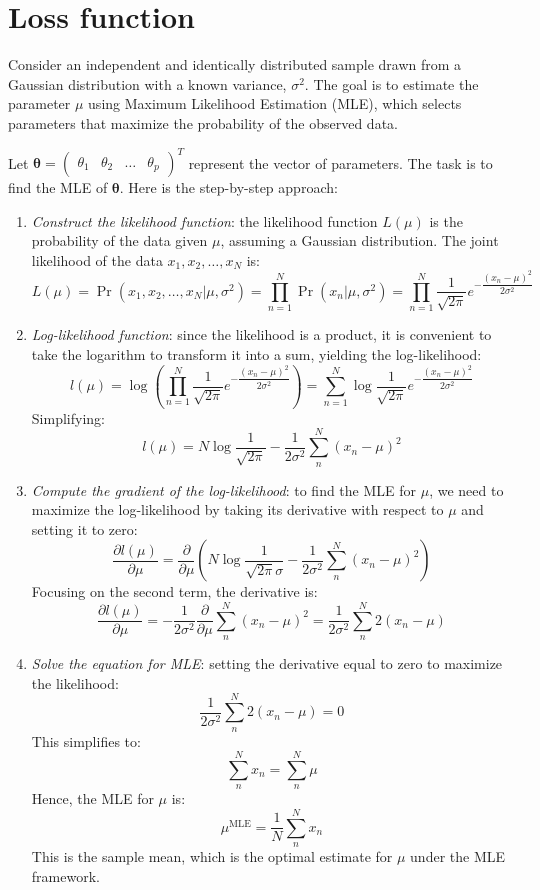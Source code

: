 \section{Loss function}

Consider an independent and identically distributed sample drawn from a Gaussian distribution with a known variance, $\sigma^2$.
The goal is to estimate the parameter $\mu$ using Maximum Likelihood Estimation (MLE), which selects parameters that maximize the probability of the observed data.

Let $\boldsymbol{\theta}=\begin{pmatrix} \theta_1 & \theta_2 & \dots & \theta_p \end{pmatrix}^T$ represent the vector of parameters. 
The task is to find the MLE of $\boldsymbol{\theta}$.
Here is the step-by-step approach:
\begin{enumerate}
    \item \textit{Construct the likelihood function}: the likelihood function $L(\mu)$ is the probability of the data given $\mu$, assuming a Gaussian distribution. 
        The joint likelihood of the data $x_1,x_2,\dots,x_N$ is: 
        \[L(\mu)=\Pr(x_1,x_2,\dots,x_N|\mu,\sigma^2)=\prod_{n=1}^N\Pr(x_n|\mu,\sigma^2)=\prod_{n=1}^N\dfrac{1}{\sqrt{2\pi}}e^{-\dfrac{(x_n-\mu)^2}{2\sigma^2}}\]
    \item \textit{Log-likelihood function}: since the likelihood is a product, it is convenient to take the logarithm to transform it into a sum, yielding the log-likelihood: 
        \[l(\mu)=\log\left(\prod_{n=1}^N\dfrac{1}{\sqrt{2\pi}}e^{-\dfrac{(x_n-\mu)^2}{2\sigma^2}}\right)=\sum_{n=1}^N\log\dfrac{1}{\sqrt{2\pi}}e^{-\dfrac{(x_n-\mu)^2}{2\sigma^2}}\]    
        Simplifying:
        \[l(\mu)=N\log\dfrac{1}{\sqrt{2\pi}}-\dfrac{1}{2\sigma^2}\sum_n^N(x_n-\mu)^2\]
    \item \textit{Compute the gradient of the log-likelihood}: to find the MLE for $\mu$, we need to maximize the log-likelihood by taking its derivative with respect to $\mu$ and setting it to zero:
        \[\dfrac{\partial l(\mu)}{\partial \mu}= \dfrac{\partial}{\partial \mu} \left( N \log \dfrac{1}{\sqrt{2 \pi} \sigma} - \dfrac{1}{2 \sigma^2} \sum_n^N (x_n - \mu)^2 \right)\]
        Focusing on the second term, the derivative is:
        \[\dfrac{\partial l(\mu)}{\partial \mu}=-\dfrac{1}{2 \sigma^2} \dfrac{\partial}{\partial \mu} \sum_n^N (x_n - \mu)^2 = \dfrac{1}{2 \sigma^2} \sum_n^N 2(x_n - \mu)\]
    \item \textit{Solve the equation for MLE}: setting the derivative equal to zero to maximize the likelihood:
        \[\dfrac{1}{2 \sigma^2} \sum_n^N 2(x_n - \mu)=0\]  
        This simplifies to:
        \[\sum_n^N x_n=\sum_n^N \mu\]   
        Hence, the MLE for $\mu$ is:
        \[\mu^{\text{MLE}}=\dfrac{1}{N}\sum_n^Nx_n\]
        This is the sample mean, which is the optimal estimate for $\mu$ under the MLE framework.
\end{enumerate}
